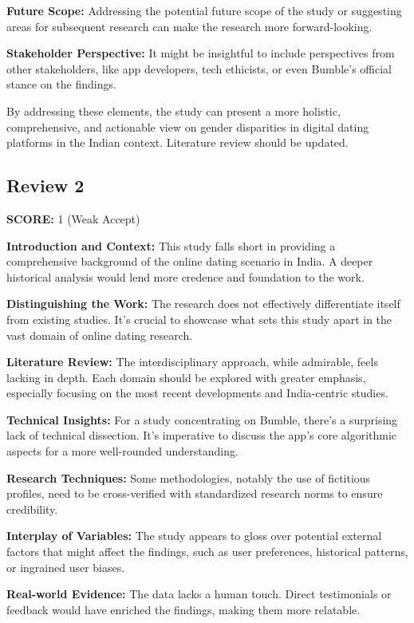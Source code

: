 \textbf{Future Scope:} Addressing the potential future scope of the study or suggesting areas for subsequent research can make the research more forward-looking.

\textbf{Stakeholder Perspective:} It might be insightful to include perspectives from other stakeholders, like app developers, tech ethicists, or even Bumble's official stance on the findings.

By addressing these elements, the study can present a more holistic, comprehensive, and actionable view on gender disparities in digital dating platforms in the Indian context.
Literature review should be updated.

\subsection*{Review 2}

\textbf{SCORE:} 1 (Weak Accept)

\textbf{Introduction and Context:} This study falls short in providing a comprehensive background of the online dating scenario in India. A deeper historical analysis would lend more credence and foundation to the work.

\textbf{Distinguishing the Work:} The research does not effectively differentiate itself from existing studies. It's crucial to showcase what sets this study apart in the vast domain of online dating research.

\textbf{Literature Review:} The interdisciplinary approach, while admirable, feels lacking in depth. Each domain should be explored with greater emphasis, especially focusing on the most recent developments and India-centric studies.

\textbf{Technical Insights:} For a study concentrating on Bumble, there's a surprising lack of technical dissection. It's imperative to discuss the app's core algorithmic aspects for a more well-rounded understanding.

\textbf{Research Techniques:} Some methodologies, notably the use of fictitious profiles, need to be cross-verified with standardized research norms to ensure credibility.

\textbf{Interplay of Variables:} The study appears to gloss over potential external factors that might affect the findings, such as user preferences, historical patterns, or ingrained user biases.

\textbf{Real-world Evidence:} The data lacks a human touch. Direct testimonials or feedback would have enriched the findings, making them more relatable.

